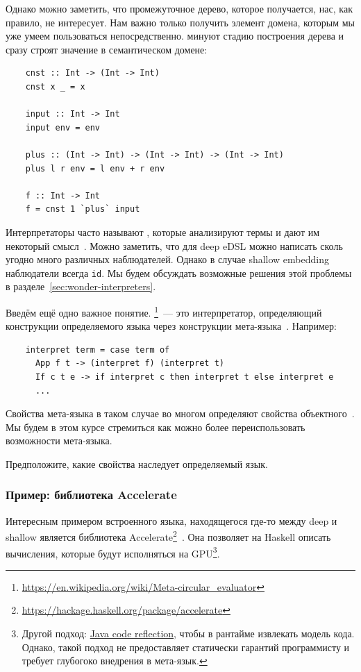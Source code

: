 Однако можно заметить, что промежуточное дерево, которое получается, нас, как правило, не интересует.
Нам важно только получить элемент домена, которым мы уже умеем пользоваться непосредственно.
 минуют стадию построения дерева и сразу строят значение в семантическом домене:
\begin{verbatim}
    cnst :: Int -> (Int -> Int)
    cnst x _ = x

    input :: Int -> Int
    input env = env

    plus :: (Int -> Int) -> (Int -> Int) -> (Int -> Int)
    plus l r env = l env + r env

    f :: Int -> Int
    f = cnst 1 `plus` input
\end{verbatim}

Интерпретаторы часто называют , которые анализируют термы и дают им некоторый смысл~\cite{gibbons2013functional}.
Можно заметить, что для deep eDSL можно написать сколь угодно много различных наблюдателей.
Однако в случае shallow embedding наблюдатели всегда \texttt{id}.
Мы будем обсуждать возможные решения этой проблемы в разделе~\ref{sec:wonder-interpreters}.

Введём ещё одно важное понятие.
\footnote{\url{https://en.wikipedia.org/wiki/Meta-circular_evaluator}}~--- это интерпретатор, определяющий конструкции определяемого языка через конструкции мета-языка~\cite{reynolds1972definitional}.
Например:
\begin{verbatim}
    interpret term = case term of
      App f t -> (interpret f) (interpret t)
      If c t e -> if interpret c then interpret t else interpret e
      ...
\end{verbatim}

Свойства мета-языка в таком случае во многом определяют свойства объектного~\cite{reynolds1972definitional,reynolds1998definitional}.
Мы будем в этом курсе стремиться как можно более переиспользовать возможности мета-языка.

\begin{task}
    Предположите, какие свойства наследует определяемый язык.
\end{task}

\subsubsection{Пример: библиотека Accelerate}

Интересным примером встроенного языка, находящегося где-то между deep и shallow является библиотека Accelerate\footnote{\url{https://hackage.haskell.org/package/accelerate}}~\cite[глава 6]{marlow2011parallel}.
Она позволяет на Haskell описать вычисления, которые будут исполняться на GPU\footnote{Другой подход: \href{https://youtu.be/6c0DB2kwF_Q?si=-nB7AkCsDWB_Q-hy}{Java code reflection}, чтобы в рантайме извлекать модель кода. Однако, такой подход не предоставляет статически гарантий программисту и требует глубогоко внедрения в мета-язык.}.

